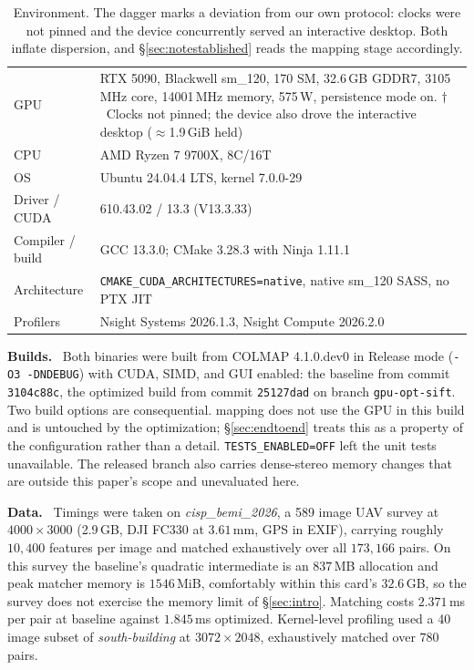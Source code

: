 \documentclass[conference]{IEEEtran}
\newcommand{\para}[1]{\smallskip\noindent\textbf{#1}\ }
\newcommand{\opt}[1]{\texttt{#1}}
\begin{document}
\begin{table}[t]
\centering
\scriptsize
\caption{Environment. The dagger marks a deviation from our own protocol:
clocks were not pinned and the device concurrently served an interactive
desktop. Both inflate dispersion, and \S\ref{sec:notestablished} reads the
mapping stage accordingly.}
\label{tab:env}
\begin{tabular}{@{}p{}p{}@{}}
\toprule
GPU & RTX 5090, Blackwell sm\_120, 170 SM, 32.6\,GB GDDR7, 3105\,MHz core,
      14001\,MHz memory, 575\,W, persistence mode on. $\dagger$~Clocks not
      pinned; the device also drove the interactive desktop
      ($\approx$1.9\,GiB held) \\
CPU & AMD Ryzen 7 9700X, 8C/16T \\
OS & Ubuntu 24.04.4 LTS, kernel 7.0.0-29 \\
Driver / CUDA & 610.43.02 / 13.3 (V13.3.33) \\
Compiler / build & GCC 13.3.0; CMake 3.28.3 with Ninja 1.11.1 \\
Architecture & \opt{CMAKE\_CUDA\_ARCHITECTURES=native}, native sm\_120 SASS,
               no PTX JIT \\
Profilers & Nsight Systems 2026.1.3, Nsight Compute 2026.2.0 \\
\bottomrule
\end{tabular}
\end{table}

\para{Builds.} Both binaries were built from COLMAP 4.1.0.dev0 in Release mode
(\opt{-O3 -DNDEBUG}) with CUDA, SIMD, and GUI enabled: the baseline from commit
\opt{3104c88c}, the optimized build from commit \opt{25127dad} on branch
\opt{gpu-opt-sift}. Two build options are consequential.
mapping does not use the GPU in this build and is untouched by the
optimization; \S\ref{sec:endtoend} treats this as a property of the
configuration rather than a detail. \opt{TESTS\_ENABLED=OFF} left the unit
tests unavailable. The released branch also carries dense-stereo memory
changes that are outside this paper's scope and unevaluated here.

\para{Data.} Timings were taken on \emph{cisp\_bemi\_2026}, a 589 image UAV
survey at $4000 \times 3000$ (2.9\,GB, DJI FC330 at $3.61$\,mm, GPS in EXIF),
carrying roughly $10{,}400$ features per image and matched exhaustively over all
$173{,}166$ pairs. On this survey the baseline's quadratic intermediate is an
$837$\,MB allocation and peak matcher memory is $1546$\,MiB, comfortably
within this card's $32.6$\,GB, so the survey does not exercise the memory
limit of \S\ref{sec:intro}. Matching costs $2.371$\,ms per pair at baseline
against $1.845$\,ms optimized. Kernel-level profiling used a 40 image subset of
\emph{south-building} at $3072 \times 2048$, exhaustively matched over $780$
pairs.
\end{document}
